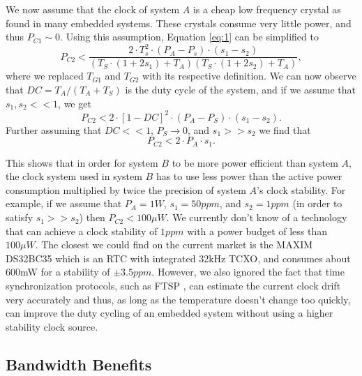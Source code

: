 We now assume that the clock of system $A$ is a cheap low frequency crystal as
found in many embedded systems. These crystals consume very little power, and thus
$P_{C1} \sim 0$. Using this assumption, Equation \ref{eq:1} can be simplified to
\begin{equation}
P_{C2} < \frac{2\cdot T_s^2\cdot(P_A-P_s)\cdot(s_1-s_2)}{(T_S\cdot(1+2s_1)+T_A)(T_S\cdot(1+2s_2)+T_A)},
	\label{eq:2}
\end{equation}
where we replaced $T_{G1}$ and $T_{G2}$ with its respective definition. We can
now observe that $DC=T_A/(T_A + T_S)$ is the duty cycle of the system, and if
we assume that $s_1, s_2 << 1$, we get
\begin{equation}
	P_{C2} < 2 \cdot [1-DC]^2\cdot (P_A-P_S) \cdot (s_1-s_2).
\end{equation}
Further assuming that $DC << 1$, $P_S \rightarrow 0$, and $s_1 >> s_2$ we find that
\begin{equation}
	P_{C2} < 2 \cdot P_A \cdot s_1.
\end{equation}

This shows that in order for system $B$ to be more power efficient than system
$A$, the clock system used in system $B$ has to use less power than the active
power consumption multiplied by twice the precision of system $A$'s clock
stability. For example, if we assume that $P_A=1W$, $s_1=50 ppm$, and $s_2=1
ppm$ (in order to satisfy $s_1 >> s_2$) then $P_{C2} < 100 \mu W$. We
currently don't know of a technology that can achieve a clock stability of
$1ppm$ with a power budget of less than $100 \mu W$. The closest we could find
on the current market is the MAXIM DS32BC35 \cite{maxim2008ds32b35} which is
an RTC with integrated 32kHz TCXO, and consumes about 600mW for a stability of
$\pm 3.5ppm$. However, we also ignored the fact that time synchronization
protocols, such as FTSP \cite{maroti2004ftsp}, can estimate the current clock
drift very accurately and thus, as long as the temperature doesn't change too
quickly, can improve the duty cycling of an embedded system without using a
higher stability clock source.


\subsection{Bandwidth Benefits}

